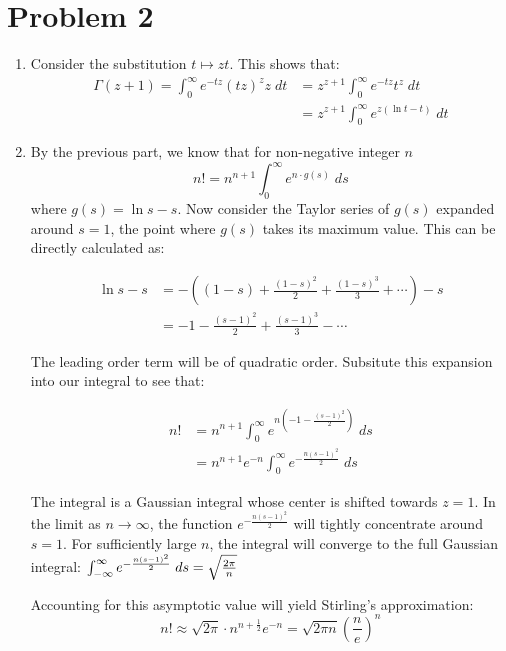 \documentclass[12pt]{article}%
\begin{document}
\section{Problem 2}
\begin{enumerate}
  \item Consider the substitution $t \mapsto zt$. This shows that:
  \begin{align*}
    \Gamma(z+1) = \int_0^\infty e^{-tz} (tz)^{z} z \; dt & = z^{z+1} \int_0^\infty e^{-tz}t^z \; dt \\
    & = z^{z+1} \int_0^\infty e^{z(\ln{t} - t)} \; dt
  \end{align*}

  \item By the previous part, we know that for non-negative integer $n$
  \[ n! = n^{n+1}\int_0^\infty e^{n\cdot g(s)} \; ds\] where $g(s) = \ln{s} - s$. Now consider the Taylor series of $g(s)$ expanded around $s = 1$, the point where $g(s)$ takes its maximum value. This can be directly calculated as:

  \begin{align*}
\ln{s} - s & = -((1-s) + \frac{(1-s)^2}{2} + \frac{(1-s)^3}{3} + \cdots) - s \\
& = -1 - \frac{(s-1)^2}{2} + \frac{(s-1)^3}{3} - \cdots
  \end{align*}

  The leading order term will be of quadratic order. Subsitute this expansion into our integral to see that:

  \begin{align*}
    n! & = n^{n+1} \int_0^\infty e^{n\left(-1 - \frac{(s-1)^2}{2}\right)} \; ds \\
       & = n^{n+1} e^{-n} \int_0^\infty e^{-\frac{n(s-1)^2}{2}} \;ds
  \end{align*}

  The integral is a Gaussian integral whose center is shifted towards $z = 1$. In the limit as $n \rightarrow \infty$, the function $e^{-\frac{n(s-1)^2}{2}}$ will tightly concentrate around $s=1$. For sufficiently large $n$, the integral will converge to the full Gaussian integral: $\int_{-\infty}^{\infty} e^{-\frac{n(s-1)^2}{2}} \; ds = \sqrt{\frac{2\pi}{n}}$

  Accounting for this asymptotic value will yield Stirling's approximation:
  \[ n! \approx \sqrt{2\pi} \cdot n^{n + \frac{1}{2}} e^{-n} = \sqrt{2\pi n} \left(\frac{n}{e}\right)^n\]

\end{enumerate}
\end{document}
